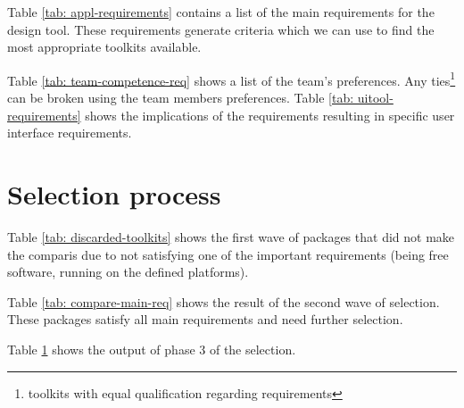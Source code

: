 Table \ref{tab: appl-requirements} contains a list of the main requirements for
the design tool. These requirements generate criteria which we can use to find
the most appropriate toolkits available.

Table \ref{tab: team-competence-req} shows a list of the team's preferences. Any
ties\footnote{toolkits with equal qualification regarding requirements} can be
broken using the team members preferences. Table \ref{tab: uitool-requirements}
shows the implications of the requirements resulting in specific user interface
requirements.

\section{Selection process}

Table \ref{tab: discarded-toolkits} shows the first wave of packages that did
not make the comparis due to not satisfying one of the important requirements
(being free software, running on the defined platforms).

Table \ref{tab: compare-main-req} shows the result of the second wave of
selection. These packages satisfy all main requirements and need further
selection.

Table \ref{} shows the output of phase 3 of the selection.
